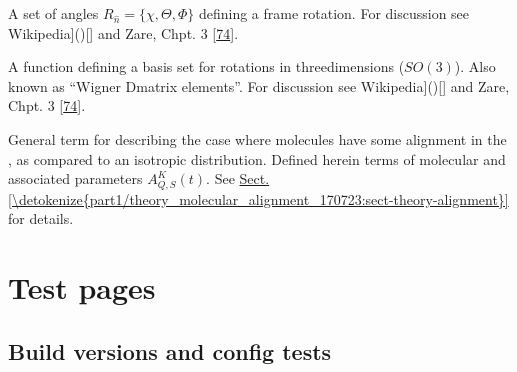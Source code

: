 \documentclass[letterpaper,table,10pt,english]{jupyterBook}
\begin{document}
\begin{description}
\sphinxAtStartPar
A set of angles \(R_{\hat{n}}=\{\chi,\Theta,\Phi\}\) defining a frame rotation. For discussion see Wikipedia{]}(){[}{]} and Zare, Chpt. 3 {[}\hyperlink{cite.backmatter/bibliography:id968}{74}{]}.

\sphinxAtStartPar
A function defining a basis set for rotations in three\sphinxhyphen{}dimensions (\(SO(3)\)). Also known as “Wigner D\sphinxhyphen{}matrix elements”. For discussion see Wikipedia{]}(){[}{]} and Zare, Chpt. 3 {[}\hyperlink{cite.backmatter/bibliography:id968}{74}{]}.

\sphinxAtStartPar
General term for describing the case where molecules have some alignment in the {\hyperref[\detokenize{backmatter/glossary:term-LF}]{}}, as compared to an isotropic distribution. Defined herein terms of molecular {\hyperref[\detokenize{backmatter/glossary:term-axis-distribution-moments}]{}} and associated parameters \(A_{Q,S}^{K}(t)\). See \hyperref[\detokenize{part1/theory_molecular_alignment_170723:sect-theory-alignment}]{Sect.\@ \ref{\detokenize{part1/theory_molecular_alignment_170723:sect-theory-alignment}}} for details.

\end{description}

\sphinxstepscope


\part{Test pages}

\sphinxstepscope


\chapter{Build versions and config tests}
\label{\detokenize{tests/build_versions_checks:build-versions-and-config-tests}}\label{\detokenize{tests/build_versions_checks::doc}}
\end{document}
